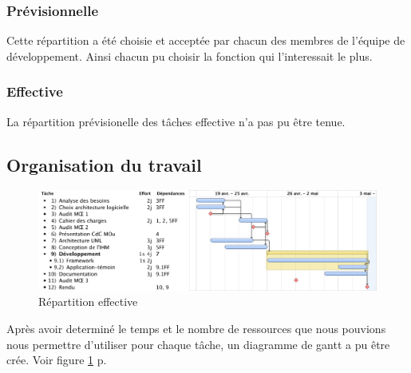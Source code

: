 \subsubsection{Prévisionnelle}

Cette répartition a été choisie et acceptée par chacun des membres de l'équipe de développement.
Ainsi chacun pu choisir la fonction qui l'interessait le plus.

\subsubsection{Effective}

La répartition prévisionelle des tâches effective n'a pas pu être tenue.

\subsection{Organisation du travail}
\begin{figure}[thbp]
	\centering
		\includegraphics[angle=90, scale=0.7]{../diagrammes/gantt_final.pdf}
	\caption{Répartition effective}
	\label{fig:gantt}
\end{figure}

Après avoir determiné le temps et le nombre de ressources que nous pouvions nous permettre d'utiliser pour chaque tâche, un diagramme de gantt a pu être crée. Voir figure  \ref{fig:gantt} p.\pageref{fig:gantt}